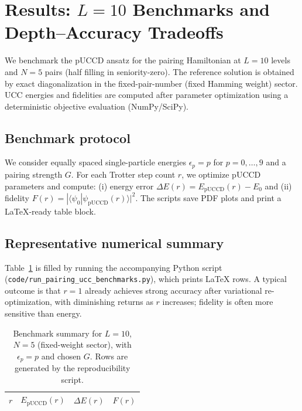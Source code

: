 \documentclass[11pt]{article}
\newcommand{\pUCCD}{\mathrm{pUCCD}}
\begin{document}
\section{Results: $L=10$ Benchmarks and Depth--Accuracy Tradeoffs}
\label{sec:results}

We benchmark the pUCCD ansatz for the pairing Hamiltonian at $L=10$ levels and $N=5$ pairs
(half filling in seniority-zero).
The reference solution is obtained by exact diagonalization in the fixed-pair-number (fixed Hamming
weight) sector. UCC energies and fidelities are computed after parameter optimization using a
deterministic objective evaluation (NumPy/SciPy).

\subsection{Benchmark protocol}
We consider equally spaced single-particle energies $\epsilon_p=p$ for $p=0,\dots,9$ and a pairing strength $G$.
For each Trotter step count $r$, we optimize pUCCD parameters and compute:
(i) energy error $\Delta E(r)=E_{\pUCCD}(r)-E_0$ and (ii) fidelity $F(r)=|\langle\psi_0|\psi_{\pUCCD}(r)\rangle|^2$.
The scripts save PDF plots and print a LaTeX-ready table block.

\subsection{Representative numerical summary}
Table~\ref{tab:bench} is filled by running the accompanying Python script
(\texttt{code/run\_pairing\_ucc\_benchmarks.py}), which prints LaTeX rows.
A typical outcome is that $r=1$ already achieves strong accuracy after variational re-optimization,
with diminishing returns as $r$ increases; fidelity is often more sensitive than energy.

\begin{table}[h!]
  \centering
  \caption{Benchmark summary for $L=10$, $N=5$ (fixed-weight sector), with $\epsilon_p=p$ and chosen $G$.
    Rows are generated by the reproducibility script.}
  \label{tab:bench}
  \begin{tabular}{@{}rrrr@{}}
    \toprule
    $r$ & $E_{\pUCCD}(r)$ & $\Delta E(r)$ & $F(r)$ \\
    \midrule
    \bottomrule
  \end{tabular}
\end{table}
\end{document}
